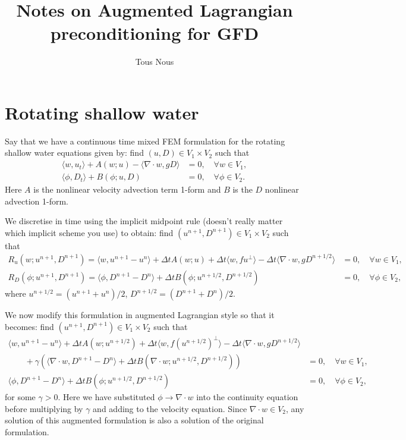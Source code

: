 \documentclass{article}
\begin{document}
\title{Notes on Augmented Lagrangian preconditioning for GFD}
\author{Tous Nous}
\maketitle

\section{Rotating shallow water}

Say that we have a continuous time mixed FEM formulation for the
rotating shallow water equations given by:
find $(u,D)\in V_1\times V_2$ such that
\begin{align}
  \langle w, u_t \rangle + A(w; u) - \langle \nabla\cdot w, gD\rangle
  & = 0, \quad \forall w \in V_1, \\
  \langle \phi, D_t \rangle + B(\phi; u, D) & = 0, \quad \forall \phi\in V_2.
\end{align}
Here $A$ is the nonlinear velocity advection term 1-form and $B$ is
the $D$ nonlinear advection 1-form.

We discretise in time using the implicit midpoint rule (doesn't really matter
which implicit scheme you use) to obtain: find $(u^{n+1},D^{n+1})
\in V_1\times V_2$ such that
\begin{align}
  R_u(w;u^{n+1},D^{n+1}) = \langle w, u^{n+1}-u^n \rangle + \Delta t A(w; u)
  + \Delta t\langle w, fu^{\perp}\rangle
  - \Delta t\langle \nabla\cdot w, gD^{n+1/2}\rangle
  & = 0, \quad \forall w \in V_1, \\
  R_D(\phi; u^{n+1},D^{n+1}) = \langle \phi, D^{n+1} - D^n \rangle
  + \Delta t B(\phi; u^{n+1/2},D^{n+1/2}) & = 0, \quad \forall \phi\in V_2,
\end{align}
where $u^{n+1/2} = (u^{n+1}+u^n)/2$, $D^{n+1/2}=(D^{n+1}+D^n)/2$.

We now modify this formulation in augmented Lagrangian style so that
it becomes: find $(u^{n+1},D^{n+1}) \in V_1\times V_2$ such that
\begin{align}
  \nonumber
  \langle w, u^{n+1}-u^n \rangle + \Delta t A(w; u^{n+1/2})
  + \Delta t\langle w, f(u^{n+1/2})^{\perp}\rangle
  - \Delta t\langle \nabla\cdot w, gD^{n+1/2}\rangle & \\
  \qquad + \gamma\left(
  \langle \nabla\cdot w, D^{n+1} - D^n \rangle
  + \Delta t B(\nabla\cdot w; u^{n+1/2},D^{n+1/2})
  \right)
  & = 0, \quad \forall w \in V_1, \\
  \langle \phi, D^{n+1} - D^n \rangle
  + \Delta t B(\phi; u^{n+1/2},D^{n+1/2}) & = 0, \quad \forall \phi\in V_2,
\end{align}
for some $\gamma>0$.  Here we have substituted $\phi\to \nabla\cdot w$
into the continuity equation before multiplying by $\gamma$ and adding
to the velocity equation. Since $\nabla\cdot w\in V_2$, any solution
of this augmented formulation is also a solution of the original
formulation.
\end{document}
